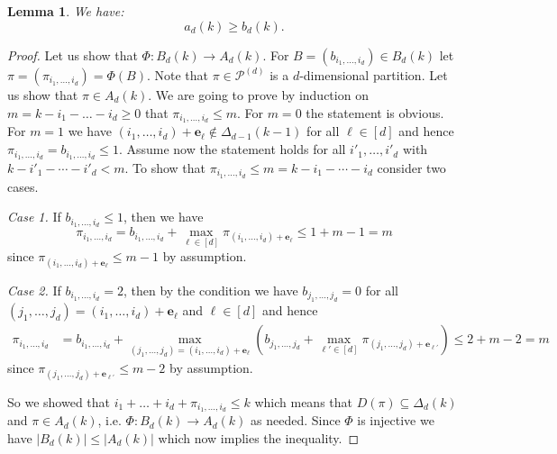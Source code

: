\documentclass[12pt]{amsart}
\newtheorem{lemma}[theorem]{Lemma}
\theoremstyle{definition}
\theoremstyle{remark}
\begin{document}
\begin{lemma}
We have: 
$$
a_d(k) \ge b_d(k).
$$
\end{lemma}

\begin{proof}
Let us show that $\Phi : B_d(k) \to A_d(k)$. 
For  $B = (b_{i_1,\ldots, i_d}) \in B_d(k)$ let $\pi = (\pi_{i_1,\ldots, i_d}) = \Phi(B)$.  
Note that $\pi \in \mathcal{P}^{(d)}$ is a $d$-dimensional partition. Let us show that $\pi \in A_d(k)$.  
We are going to prove by induction on $m = k - i_1 - \ldots - i_d \ge 0$ that $\pi_{i_1,\ldots, i_d} \le m$. For $m = 0$ the statement is obvious. For $m = 1$ we have $(i_1,\ldots, i_d) + \mathbf{e}_{\ell} \not\in \Delta_{d-1}(k-1)$ for all $\ell \in [d]$ and hence $\pi_{i_1,\ldots, i_d} = b_{i_1,\ldots, i_d} \le 1$. %
Assume now the statement holds for all $i'_1,\ldots, i'_d$ with $k - i'_1 - \cdots - i'_d < m$. To show that $\pi_{i_1,\ldots, i_d} \le m = k - i_1 - \cdots - i_d$ consider two cases. 

{\it Case 1.} If $b_{i_1,\ldots, i_d} \le 1$, then we have 
$$
\pi_{i_1,\ldots, i_d} = b_{i_1,\ldots, i_d} + \max_{\ell \in [d]} \pi_{(i_1, \ldots, i_d) + \mathbf{e}_{\ell}} \le 1 + m - 1 = m
$$
since $\pi_{(i_1,\ldots, i_d) + \mathbf{e}_{\ell}} \le m - 1$ by  assumption.

{\it Case 2.} If $b_{i_1,\ldots, i_d} = 2$, then by the condition we have $b_{j_1, \ldots, j_d}  = 0$ for all $(j_1,\ldots, j_d) = (i_1,\ldots, i_d) + \mathbf{e}_{\ell}$ and $\ell \in [d]$ and hence 
\begin{align*}
\pi_{i_1,\ldots, i_d} %
&= b_{i_1,\ldots, i_d} + \max_{(j_1,\ldots, j_d) = (i_1,\ldots, i_d) + \mathbf{e}_{\ell}} \left( b_{j_1,\ldots, j_d} + \max_{\ell' \in [d]} \pi_{(j_1,\ldots, j_d) + \mathbf{e_{\ell'}}}  \right) \le 2 + m - 2 = m
\end{align*}
since $\pi_{(j_1,\ldots, j_d) + \mathbf{e}_{\ell'}} \le m - 2$ by assumption.

So we showed that $i_1 + \ldots + i_d + \pi_{i_1,\ldots, i_d} \le k$ which means that $D(\pi) \subseteq \Delta_d(k)$ and $\pi \in {A}_d(k)$, i.e. $\Phi : B_d(k) \to A_d(k)$ as needed.
Since $\Phi$ is injective we have $|B_d(k)| \le |A_d(k)|$ which now implies the inequality. 
\end{proof}
\end{document}
